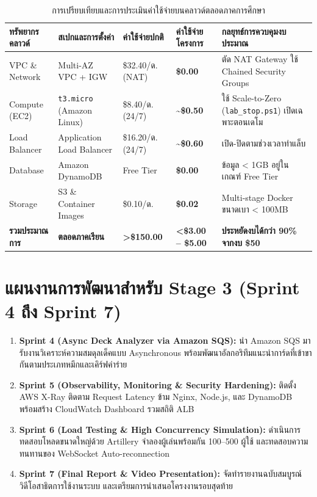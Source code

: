 \documentclass[12pt,a4paper]{report}
\begin{document}
\begin{table}[H]
\centering
\caption{การเปรียบเทียบและการประเมินค่าใช้จ่ายบนคลาวด์ตลอดภาคการศึกษา}
\label{tab:cost_table}
\small
\begin{tabularx}{\textwidth}{lp{2.8cm}p{2.2cm}p{2.2cm}>{\raggedright\arraybackslash}X}
\toprule
\textbf{ทรัพยากรคลาวด์} & \textbf{สเปกและการตั้งค่า} & \textbf{ค่าใช้จ่ายปกติ} & \textbf{ค่าใช้จ่ายโครงการ} & \textbf{กลยุทธ์การควบคุมงบประมาณ} \\
\midrule
VPC \& Network & Multi-AZ VPC + IGW & \$32.40/ด. (NAT) & \textbf{\$0.00} & ตัด NAT Gateway ใช้ Chained Security Groups \\
Compute (EC2) & \texttt{t3.micro} (Amazon Linux) & \$8.40/ด. (24/7) & \textbf{\textasciitilde\$0.50} & ใช้ Scale-to-Zero (\texttt{lab\_stop.ps1}) เปิดเฉพาะตอนเดโม \\
Load Balancer & Application Load Balancer & \$16.20/ด. (24/7) & \textbf{\textasciitilde\$0.60} & เปิด-ปิดตามช่วงเวลาทำแล็บ \\
Database & Amazon DynamoDB & Free Tier & \textbf{\$0.00} & ข้อมูล < 1GB อยู่ในเกณฑ์ Free Tier \\
Storage & S3 \& Container Images & \$0.10/ด. & \textbf{\$0.02} & Multi-stage Docker ขนาดเบา < 100MB \\
\midrule
\textbf{รวมประมาณการ} & \textbf{ตลอดภาคเรียน} & \textbf{>\$150.00} & \textbf{<\$3.00 -- \$5.00} & \textbf{ประหยัดงบได้กว่า 90\% จากงบ \$50} \\
\bottomrule
\end{tabularx}
\end{table}

\section{แผนงานการพัฒนาสำหรับ Stage 3 (Sprint 4 ถึง Sprint 7)}
\begin{enumerate}
    \item \textbf{Sprint 4 (Async Deck Analyzer via Amazon SQS):} นำ Amazon SQS มารับงานวิเคราะห์ความสมดุลเด็คแบบ Asynchronous พร้อมพัฒนาอัลกอริทึมแนะนำการ์ดที่เข้าขากันตามประเภทหมึกและเคิร์ฟค่าร่าย
    \item \textbf{Sprint 5 (Observability, Monitoring \& Security Hardening):} ติดตั้ง AWS X-Ray ติดตาม Request Latency ข้าม Nginx, Node.js, และ DynamoDB พร้อมสร้าง CloudWatch Dashboard รวมสถิติ ALB
    \item \textbf{Sprint 6 (Load Testing \& High Concurrency Simulation):} ดำเนินการทดสอบโหลดขนาดใหญ่ด้วย Artillery จำลองผู้เล่นพร้อมกัน 100--500 ผู้ใช้ และทดสอบความทนทานของ WebSocket Auto-reconnection
    \item \textbf{Sprint 7 (Final Report \& Video Presentation):} จัดทำรายงานฉบับสมบูรณ์ วิดีโอสาธิตการใช้งานระบบ และเตรียมการนำเสนอโครงงานรอบสุดท้าย
\end{enumerate}
\end{document}

